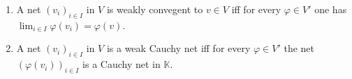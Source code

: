 \documentclass[prb,12pt]{revtex4-2}
\theoremstyle{definition}
\theoremstyle{definition}
\theoremstyle{definition}
\newenvironment{parts}{\begin{enumerate}[label=(\alph*)]}{\end{enumerate}}
\begin{document}
\begin{Theorem}
	\begin{parts}
	\item A net $(v_i)_{i\in I}$ in $V$ is weakly convegent to $v\in V$ iff for every $\varphi\in V'$ one has $\lim_{i \in I} \varphi(v_i)=\varphi(v)$.
	\item A net $(v_i)_{i\in I}$ in $V$ is a weak Cauchy net iff for every $\varphi \in V'$ the net $(\varphi(v_i))_{i\in I}$ is a Cauchy net in $\mathbb{K}$.
	\end{parts}
\end{Theorem}
\end{document}
